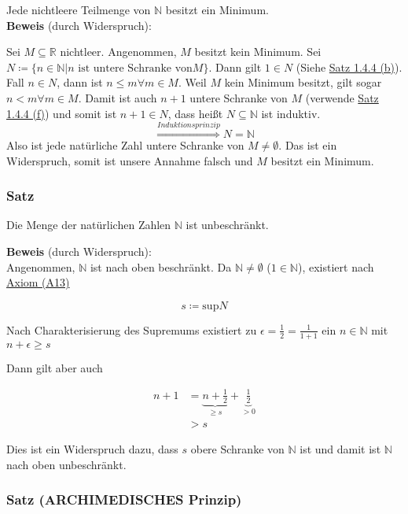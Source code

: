 \documentclass{article}
\begin{document}
Jede nichtleere Teilmenge von $\mathbb{N}$ besitzt ein Minimum. \\

\textbf{Beweis} (durch Widerspruch):

Sei $M \subseteq \mathbb{R}$ nichtleer. Angenommen, $M$ besitzt kein Minimum.
Sei $N \coloneqq \{ n \in \mathbb{N} | n \text{ ist untere Schranke von} M \}$.
Dann gilt $1 \in N$ (Siehe \hyperref[sec:1.4.4_b]{Satz 1.4.4 (b)}).
Fall $n \in N$, dann ist $n \leq m \forall m \in M$.
Weil $M$ kein Minimum besitzt, gilt sogar $n < m \forall m \in M$.
Damit ist auch $n + 1$ untere Schranke von $M$ (verwende \hyperref[sec:1.4.4_f]{Satz 1.4.4 (f)})
und somit ist $n + 1 \in N$, dass heißt $N \subseteq \mathbb{N}$ ist induktiv.
\[
  \overset{\hyperref[sec:1.4.3]{Induktionsprinzip}}\Rightarrow N = \mathbb{N}
\]
Also ist jede natürliche Zahl untere Schranke von $M \ne \emptyset$.
Das ist ein Widerspruch, somit ist unsere Annahme falsch und $M$ besitzt ein Minimum.

\subsubsection{Satz}
\label{sec:1.4.6}
Die Menge der natürlichen Zahlen $\mathbb{N}$ ist unbeschränkt.

\textbf{Beweis} (durch Widerspruch): \\

Angenommen, $\mathbb{N}$ ist nach oben beschränkt. Da $\mathbb{N} \ne \emptyset$ ($1 \in \mathbb{N}$),
existiert nach \hyperref[axiom:13]{Axiom (A13)}

\[
  s \coloneqq \text{sup} N
\]

Nach Charakterisierung des Supremums existiert zu $\epsilon = \frac{1}{2} = \frac{1}{1 + 1}$
ein $n \in \mathbb{N}$ mit $n + \epsilon \geq s$

Dann gilt aber auch

\begin{align*}
  n + 1 &= \underbrace{n + \frac{1}{2}}_{\geq s} + \underbrace{\frac{1}{2}}_{> 0} \\
        &> s
\end{align*}

Dies ist ein Widerspruch dazu, dass $s$ obere Schranke von $\mathbb{N}$ ist und damit ist $\mathbb{N}$
nach oben unbeschränkt.

\subsubsection{Satz (ARCHIMEDISCHES Prinzip)}
\label{sec:1.4.7}
\end{document}
